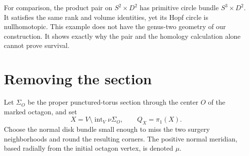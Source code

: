 \documentclass[11pt]{amsart}
\theoremstyle{definition}
\theoremstyle{remark}
\begin{document}
For comparison, the product pair on $S^2\times D^2$ has primitive
circle bundle $S^3\times D^2$. It satisfies the same rank and volume
identities, yet its Hopf circle is nullhomotopic. This example does
not have the genus-two geometry of our construction. It shows exactly
why the pair and the homology calculation alone cannot prove survival.

\section{Removing the section}\label{sec:exterior}

Let $\Sigma_O$ be the proper punctured-torus section through the
center $O$ of the marked octagon, and set
\[
 X=V\setminus\operatorname{int}_V\nu\Sigma_O,\qquad
 Q_X=\pi_1(X).
\]
Choose the normal disk bundle small enough to miss the two surgery
neighborhoods and round the resulting corners. The positive normal
meridian, based radially from the initial octagon vertex, is denoted
$\mu$.
\end{document}
